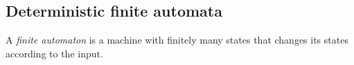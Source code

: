 \subsection{Deterministic finite automata}
A \emph{finite automaton} is a machine with finitely many states that changes its states according to the input.
